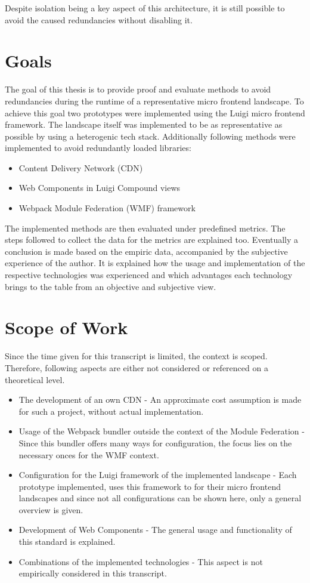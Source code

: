 Despite isolation being a key aspect of this architecture, it is still possible to avoid the caused redundancies without disabling it.

\section{Goals}

The goal of this thesis is to provide proof and evaluate methods to avoid redundancies during the runtime of a representative micro frontend landscape. To achieve this goal two prototypes were implemented using the Luigi micro frontend framework. The landscape itself was implemented to be as representative as possible by using a heterogenic tech stack. Additionally following methods were implemented to avoid redundantly loaded libraries:

\begin{itemize}
	\item Content Delivery Network (CDN)
	\item Web Components in Luigi Compound views
	\item Webpack Module Federation (WMF) framework
\end{itemize}

The implemented methods are then evaluated under predefined metrics. The steps followed to collect the data for the metrics are explained too.
Eventually a conclusion is made based on the empiric data, accompanied by the subjective experience of the author. It is explained how the usage and implementation of the respective technologies was experienced and which advantages each technology brings to the table from an objective and subjective view.
  
\section{Scope of Work}

Since the time given for this transcript is limited, the context is scoped. Therefore, following aspects are either not considered or referenced on a theoretical level.

\begin{itemize}
	\item The development of an own CDN - An approximate cost assumption is made for such a project, without actual implementation.
	\item Usage of the Webpack bundler outside the context of the Module Federation - Since this bundler offers many ways for configuration, the focus lies on the necessary onces for the WMF context.
	\item Configuration for the Luigi framework of the implemented landscape - Each prototype implemented, uses this framework to for their micro frontend landscapes and since not all configurations can be shown here, only a general overview is given.
	\item Development of Web Components - The general usage and functionality of this standard is explained.
	\item Combinations of the implemented technologies - This aspect is not empirically considered in this transcript.
\end{itemize}

